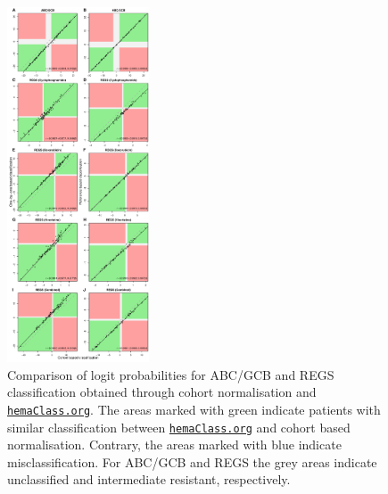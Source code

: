 \documentclass{article}
\newcommand{\hemaClass}{\href{http://hemaClass.org}{\texttt{hemaClass.org}}}
\begin{document}
\begin{figure}
\begin{center}
\includegraphics[width=0.375\textwidth]{figures/figure2.pdf}
\end{center}
\caption{Comparison of logit probabilities for ABC/GCB and REGS classification obtained through cohort normalisation and \hemaClass{}.
The areas marked with green indicate patients with similar classification between \hemaClass{} and cohort based normalisation.
Contrary, the areas marked with blue indicate misclassification.
For ABC/GCB and REGS the grey areas indicate unclassified and intermediate resistant, respectively.}
\label{fig:ABCGCBDrug}
\end{figure}
\end{document}
